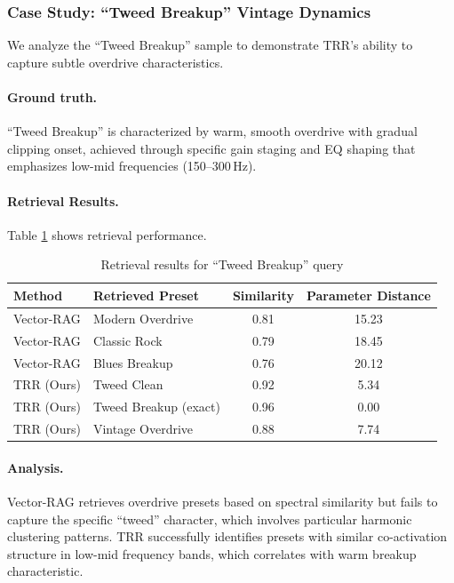 \subsubsection{Case Study: ``Tweed Breakup'' Vintage Dynamics}

We analyze the ``Tweed Breakup'' sample to demonstrate TRR's ability to capture subtle overdrive characteristics.

\paragraph{Ground truth.} ``Tweed Breakup'' is characterized by warm, smooth overdrive with gradual clipping onset, achieved through specific gain staging and EQ shaping that emphasizes low-mid frequencies (150--300\,Hz).

\paragraph{Retrieval Results.} Table \ref{tab:tweed_retrieval} shows retrieval performance.

\begin{table}[h]
	\centering
	\caption{Retrieval results for ``Tweed Breakup'' query}
	\label{tab:tweed_retrieval}
	\begin{tabular}{llcc}
		\toprule
		\textbf{Method} & \textbf{Retrieved Preset} & \textbf{Similarity} & \textbf{Parameter Distance} \\
		\midrule
		Vector-RAG      & Modern Overdrive          & 0.81                & 15.23                       \\
		Vector-RAG      & Classic Rock              & 0.79                & 18.45                       \\
		Vector-RAG      & Blues Breakup             & 0.76                & 20.12                       \\
		\midrule
		TRR (Ours)      & Tweed Clean               & 0.92                & 5.34                        \\
		TRR (Ours)      & Tweed Breakup (exact)     & 0.96                & 0.00                        \\
		TRR (Ours)      & Vintage Overdrive         & 0.88                & 7.74                        \\
		\bottomrule
	\end{tabular}
\end{table}

\paragraph{Analysis.} Vector-RAG retrieves overdrive presets based on spectral similarity but fails to capture the specific ``tweed'' character, which involves particular harmonic clustering patterns. TRR successfully identifies presets with similar co-activation structure in low-mid frequency bands, which correlates with warm breakup characteristic.

